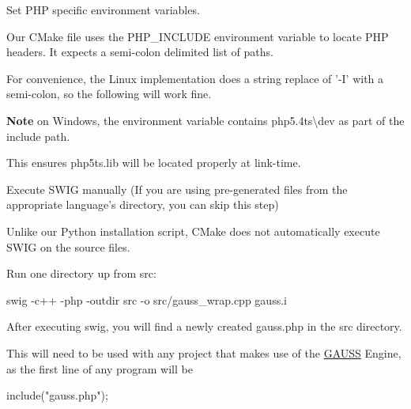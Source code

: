 \begin{DoxyEnumerate}
\item Set P\-H\-P specific environment variables.

Our C\-Make file uses the {\ttfamily P\-H\-P\-\_\-\-I\-N\-C\-L\-U\-D\-E} environment variable to locate P\-H\-P headers. It expects a semi-\/colon delimited list of paths.

For convenience, the Linux implementation does a string replace of '{\ttfamily -\/\-I}' with a semi-\/colon, so the following will work fine. 


{\bfseries Note} on Windows, the environment variable contains {\ttfamily php5.\-4ts\textbackslash{}dev} as part of the include path.

This ensures {\ttfamily php5ts.\-lib} will be located properly at link-\/time.
\item Execute S\-W\-I\-G manually (If you are using pre-\/generated files from the appropriate language's directory, you can skip this step)

Unlike our Python installation script, C\-Make does not automatically execute S\-W\-I\-G on the source files.

Run one directory up from {\ttfamily src}\-: \begin{DoxyVerb}swig -c++ -php -outdir src -o src/gauss_wrap.cpp gauss.i
\end{DoxyVerb}

\end{DoxyEnumerate}

After executing {\ttfamily swig}, you will find a newly created {\ttfamily gauss.\-php} in the {\ttfamily src} directory.

This will need to be used with any project that makes use of the \hyperlink{class_g_a_u_s_s}{G\-A\-U\-S\-S} Engine, as the first line of any program will be \begin{DoxyVerb}include("gauss.php");
\end{DoxyVerb}


